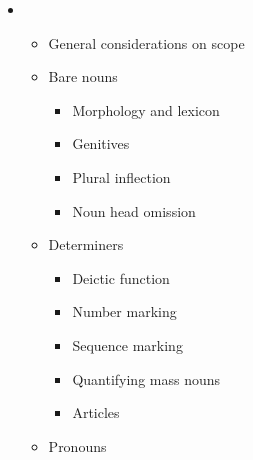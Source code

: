 \setcounter{itemize}{4}
\begin{itemize}
\item \begin{itemize}
\item \begin{styleListParagraph}
General considerations on scope 
\end{styleListParagraph}
\item \begin{styleListParagraph}
Bare nouns 
\end{styleListParagraph}

\begin{itemize}
\item \begin{styleListParagraph}
Morphology and lexicon
\end{styleListParagraph}
\item \begin{styleListParagraph}
Genitives 
\end{styleListParagraph}
\item \begin{styleListParagraph}
Plural inflection 
\end{styleListParagraph}
\item \begin{styleListParagraph}
Noun head omission
\end{styleListParagraph}
\end{itemize}
\item \begin{styleListParagraph}
Determiners
\end{styleListParagraph}

\begin{itemize}
\item \begin{styleListParagraph}
Deictic function
\end{styleListParagraph}
\item \begin{styleListParagraph}
Number marking
\end{styleListParagraph}
\item \begin{styleListParagraph}
Sequence marking 
\end{styleListParagraph}
\item \begin{styleListParagraph}
Quantifying mass nouns 
\end{styleListParagraph}
\item \begin{styleListParagraph}
Articles 
\end{styleListParagraph}
\end{itemize}
\item \begin{styleListParagraph}
Pronouns
\end{styleListParagraph}


\end{itemize}
\end{itemize}
